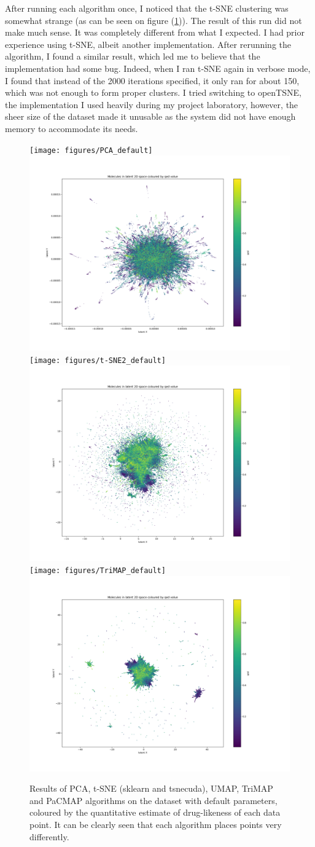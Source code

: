 After running each algorithm once, I noticed that the t-SNE clustering was somewhat strange (as can be seen on figure (\ref{fig:default_run})). The result of this run did not make much sense. It was completely different from what I expected. I had prior experience using t-SNE, albeit another implementation. After rerunning the algorithm, I found a similar result, which led me to believe that the implementation had some bug. Indeed, when I ran t-SNE again in verbose mode, I found that instead of the 2000 iterations specified, it only ran for about 150, which was not enough to form proper clusters. I tried switching to openTSNE, the implementation I used heavily during my project laboratory, however, the sheer size of the dataset made it unusable as the system did not have enough memory to accommodate its needs.

\begin{figure}[!ht]
	\centering
	\texttt{[image: figures/PCA\_default]}
	\includegraphics[width=0.49\columnwidth, keepaspectratio]{figures/t-SNE_default}
	\texttt{[image: figures/t-SNE2\_default]}
	\includegraphics[width=0.49\columnwidth, keepaspectratio]{figures/UMAP_default}
	\texttt{[image: figures/TriMAP\_default]}
	\includegraphics[width=0.49\columnwidth, keepaspectratio]{figures/PaCMAP_default}
	\caption{Results of PCA, t-SNE (sklearn and tsnecuda), UMAP, TriMAP and PaCMAP algorithms on the dataset with default parameters, coloured by the quantitative estimate of drug-likeness of each data point. It can be clearly seen that each algorithm places points very differently.}
	\label{fig:default_run}
\end{figure}


